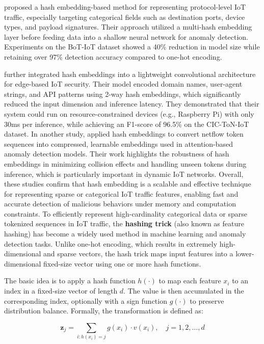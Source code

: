 \begin{ZhChapter}
    \cite{gupta2020hash} proposed a hash embedding-based method for representing protocol-level IoT traffic, especially targeting categorical fields such as destination ports, device types, and payload signatures. Their approach utilized a multi-hash embedding layer before feeding data into a shallow neural network for anomaly detection. Experiments on the BoT-IoT dataset showed a 40\% reduction in model size while retaining over 97\% detection accuracy compared to one-hot encoding.

    \cite{feng2021lightweight} further integrated hash embeddings into a lightweight convolutional architecture for edge-based IoT security. Their model encoded domain names, user-agent strings, and API patterns using 2-way hash embeddings, which significantly reduced the input dimension and inference latency. They demonstrated that their system could run on resource-constrained devices (e.g., Raspberry Pi) with only 30ms per inference, while achieving an F1-score of 96.5\% on the CIC-ToN-IoT dataset.
    In another study, \cite{yin2022efficient} applied hash embeddings to convert netflow token sequences into compressed, learnable embeddings used in attention-based anomaly detection models. Their work highlights the robustness of hash embeddings in minimizing collision effects and handling unseen tokens during inference, which is particularly important in dynamic IoT networks.
    Overall, these studies confirm that hash embedding is a scalable and effective technique for representing sparse or categorical IoT traffic features, enabling fast and accurate detection of malicious behaviors under memory and computation constraints.
    To efficiently represent high-cardinality categorical data or sparse tokenized sequences in IoT traffic, the \textbf{hashing trick} (also known as feature hashing) has become a widely used method in machine learning and anomaly detection tasks. Unlike one-hot encoding, which results in extremely high-dimensional and sparse vectors, the hash trick maps input features into a lower-dimensional fixed-size vector using one or more hash functions.

    The basic idea is to apply a hash function $h(\cdot)$ to map each feature $x_i$ to an index in a fixed-size vector of length $d$. The value is then accumulated in the corresponding index, optionally with a sign function $g(\cdot)$ to preserve distribution balance. Formally, the transformation is defined as:

    \begin{equation}
        \mathbf{z}_j = \sum_{i: h(x_i) = j} g(x_i) \cdot v(x_i), \quad j = 1, 2, \dots, d
    \end{equation}


\end{ZhChapter}
